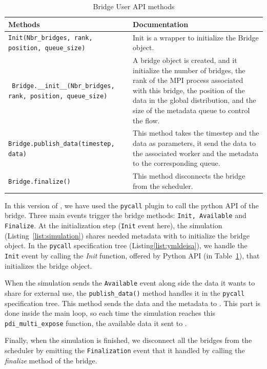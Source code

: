 \begin{table}[ht]
\begin{tabular}{||  m{6cm}  m{9cm} ||} 
 \hline
Methods & Documentation\\ 
 \hline\hline
 \texttt{Init(Nbr\_bridges, rank, position, queue\_size) } & Init is a wrapper to initialize the Bridge object.\\ 
 \hline \hline 
\texttt{ Bridge.\_\_init\_\_(Nbr\_bridges, rank, position, queue\_size)} & A bridge object is created, and it initialize the number of bridges, the rank of the MPI process associated with this bridge, the position of the data in the global distribution, and the size of the metadata queue to control the flow. \\ 
 \hline\hline
 \texttt{Bridge.publish\_data(timestep, data)} & This method takes the timestep and the data as parameters, it send the data to the associated worker and the metadata to the corresponding queue. \\
 \hline\hline
 \texttt{Bridge.finalize()} &   This method disconnects the bridge from the scheduler. \\
 \hline
\end{tabular}
\caption{Bridge User API methods}
\label{table:bridge}
\end{table}

In this version of \deisa, we have used the \pdi \texttt{pycall} plugin to call the python API of the bridge. Three main events trigger the bridge methods: \texttt{Init, Available} and \texttt{Finalize}. 
At the initialization step (\texttt{Init} event here), the simulation (Listing~\ref{list:simulation}) shares needed metadata with \pdi to initialize the bridge object. In the \texttt{pycall} specification tree (Listing\ref{list:ymldeisa}), we handle the \texttt{Init} event by calling the \textit{Init} function, offered by Python \deisa API (in Table~\ref{table:bridge}), that initializes the bridge object.

When the simulation sends the \texttt{Available} event along side the data it wants to share for external use, the \texttt{publish\_data()} method handles it in the \texttt{pycall} specification tree. This method sends the data and the metadata to \dask. This part is done inside the main loop, so each time the simulation reaches this \texttt{pdi\_multi\_expose} function, the available data it sent to \dask.  

Finally, when the simulation is finished, we disconnect all the bridges from the \dask scheduler by emitting the \texttt{Finalization} event that it handled by calling the \textit{finalize} method of the bridge. 

